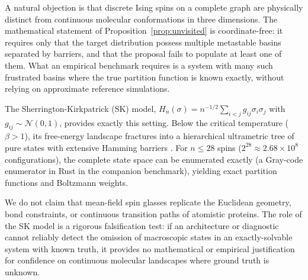 A natural objection is that discrete Ising spins on a complete graph are physically distinct from continuous molecular conformations in three dimensions. The mathematical statement of Proposition~\ref{prop:unvisited} is coordinate-free: it requires only that the target distribution possess multiple metastable basins separated by barriers, and that the proposal fails to populate at least one of them. What an empirical benchmark requires is a system with many such frustrated basins where the true partition function is known exactly, without relying on approximate reference simulations.

The Sherrington-Kirkpatrick (SK) model, $H_n(\sigma)=n^{-1/2}\sum_{i<j}g_{ij}\sigma_i\sigma_j$ with $g_{ij}\sim\mathcal N(0,1)$, provides exactly this setting. Below the critical temperature ($\beta > 1$), its free-energy landscape fractures into a hierarchical ultrametric tree of pure states with extensive Hamming barriers \citep{parisi1980,talagrand2006}. For $n\le28$ spins ($2^{28}\approx 2.68\times 10^8$ configurations), the complete state space can be enumerated exactly (a Gray-code enumerator in Rust in the companion benchmark), yielding exact partition functions and Boltzmann weights.

We do not claim that mean-field spin glasses replicate the Euclidean geometry, bond constraints, or continuous transition paths of atomistic proteins. The role of the SK model is a rigorous falsification test: if an architecture or diagnostic cannot reliably detect the omission of macroscopic states in an exactly-solvable system with known truth, it provides no mathematical or empirical justification for confidence on continuous molecular landscapes where ground truth is unknown.